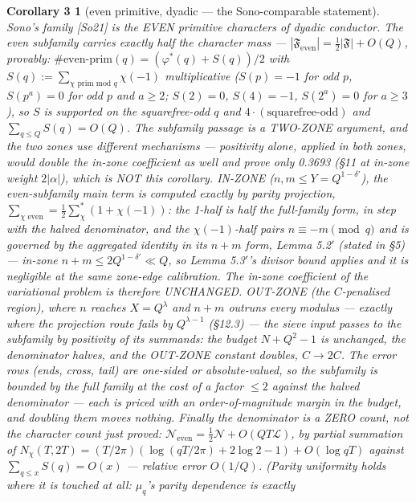 \documentclass[11pt]{amsart}
\theoremstyle{plain}
\newtheorem*{corollarythree}{Corollary 3}
\theoremstyle{remark}
\begin{document}
\begin{corollarythree}[even primitive, dyadic --- the Sono-comparable statement]
Sono's family [So21] is the EVEN primitive characters of dyadic conductor. The even
subfamily carries exactly half the character mass ---
$|\mathfrak{F}_{\mathrm{even}}| = \tfrac{1}{2}|\mathfrak{F}| + O(Q)$, provably:
$\#\text{even-prim}(q) = (\varphi^{*}(q) + S(q))/2$ with
$S(q) := \sum_{\chi \text{ prim mod } q} \chi(-1)$ multiplicative ($S(p) = -1$ for odd
$p$, $S(p^a) = 0$ for odd $p$ and $a \ge 2$; $S(2) = 0$, $S(4) = -1$, $S(2^a) = 0$ for
$a \ge 3$), so $S$ is supported on the squarefree-odd $q$ and
$4\cdot(\text{squarefree-odd})$ and $\sum_{q\le Q} S(q) = O(Q)$. The subfamily passage
is a TWO-ZONE argument, and the two zones use different mechanisms --- positivity
alone, applied in both zones, would double the in-zone coefficient as well and prove
only 0.3693 (\S11 at in-zone weight $2|\alpha|$), which is NOT this corollary. IN-ZONE
($n, m \le Y = Q^{1-\delta'}$), the even-subfamily main term is computed exactly by
parity projection, $\sum_{\chi \text{ even}} = \tfrac{1}{2}\sum^{*}_{\chi}(1 + \chi(-1))$:
the 1-half is half the full-family form, in step with the halved denominator, and the
$\chi(-1)$-half pairs $n \equiv -m \pmod q$ and is governed by the aggregated identity
in its $n + m$ form, Lemma 5.2$'$ (stated in \S5) --- in-zone
$n + m \le 2Q^{1-\delta'} \ll Q$, so Lemma 5.3$'$'s divisor bound applies and it is
negligible at the same zone-edge calibration. The in-zone coefficient of the
variational problem is therefore UNCHANGED. OUT-ZONE (the $C$-penalised region), where
$n$ reaches $X = Q^\lambda$ and $n + m$ outruns every modulus --- exactly where the
projection route fails by $Q^{\lambda-1}$ (\S12.3) --- the sieve input passes to the
subfamily by positivity of its summands: the budget $N + Q^2 - 1$ is unchanged, the
denominator halves, and the OUT-ZONE constant doubles, $C \to 2C$. The error rows
(ends, cross, tail) are one-sided or absolute-valued, so the subfamily is bounded by
the full family at the cost of a factor $\le 2$ against the halved denominator --- each
is priced with an order-of-magnitude margin in the budget, and doubling them moves
nothing. Finally the denominator is a ZERO count, not the character count just proved:
$\mathcal{N}_{\mathrm{even}} = \tfrac{1}{2}\mathcal{N} + O(QT\mathcal{L})$, by partial
summation of
$N_\chi(T, 2T) = (T/2\pi)(\log(qT/2\pi) + 2 \log 2 - 1) + O(\log qT)$ against
$\sum_{q\le x}S(q) = O(x)$ --- relative error $O(1/Q)$. (Parity uniformity holds where
it is touched at all: $\mu_q$'s parity dependence is exactly

\end{corollarythree}
\end{document}
